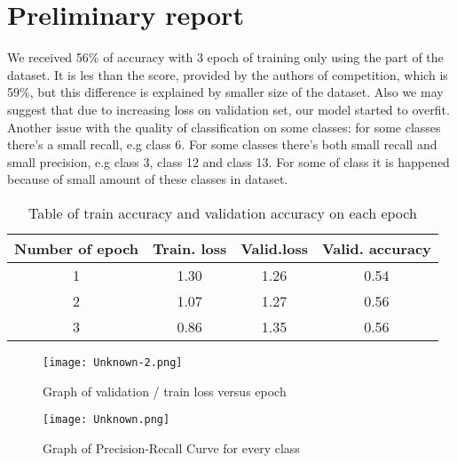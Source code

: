 \documentclass{article}
\begin{document}



  
\section{Preliminary report}

We received 56$\%$ of accuracy with 3 epoch of training only using the part of the dataset. It is les than the score, provided by the authors of competition, which is 59$\%$, but this difference is explained by smaller size of the dataset. Also we may suggest that due to increasing loss on validation set, our model started to overfit. Another issue with the quality of classification on some classes: for some classes there's a small recall, e.g class 6. For some classes there's both small recall and small precision, e.g class 3, class 12 and class 13. For some of class it is happened because of small amount of these classes in dataset. 


\begin{table}[bhtp]
	\centering
	\caption{Table of train accuracy and validation accuracy on each epoch}
	\label{tbl:space_and_subspace}
	\begin{tabular}{| c | c | c | c | }
		\hline
		Number of epoch & Train. loss & Valid.loss & Valid. accuracy \\
		\hline
		1 & 1.30  & 1.26 & 0.54  \\
        \hline
		2 & 1.07 & 1.27 & 0.56  \\
		\hline
        3 & 0.86  & 1.35 & 0.56  \\
        \hline
	\end{tabular}
\end{table}

\begin{figure}[bhtp]
	\texttt{[image: Unknown-2.png]}
	\caption{Graph of validation / train loss versus epoch}
	\label{fig:1}
\end{figure}


\begin{figure}[bhtp]
	\texttt{[image: Unknown.png]}
	\caption{Graph of Precision-Recall Curve for every class}
	\label{fig:2}
\end{figure}







\end{document}
